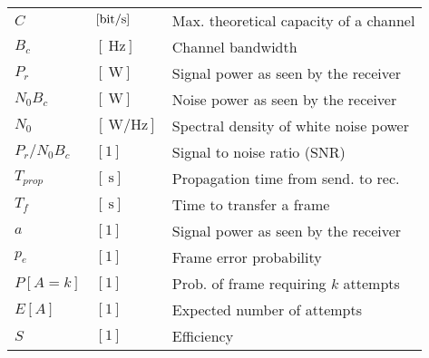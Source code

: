 \documentclass{form}
\begin{document}
\begin{center}
    \noindent%
    \begin{minipage}{0.49\textwidth}
        \begin{tabular}{@{}l l | p{59mm}@{}}
            $C$           & $[\SI{}{\bit/\second}     ]$ & Max. theoretical capacity of a channel                      \\
            $B_c$         & $[\SI{}{\hertz}           ]$ & Channel bandwidth                                           \\
            $P_r$         & $[\SI{}{\watt}            ]$ & Signal power as seen by the receiver                        \\
            $N_0 B_c$     & $[\SI{}{\watt}            ]$ & Noise power as seen by the receiver                         \\
            $N_0$         & $[\SI{}{\watt/\hertz}     ]$ & Spectral density of white noise power                       \\
            $P_r/N_0 B_c$ & $[1                       ]$ & Signal to noise ratio (SNR)                                 \\
            $T_{prop}$    & $[\SI{}{\second}          ]$ & Propagation time from send. to rec.                         \\
            $T_f$         & $[\SI{}{\second}          ]$ & Time to transfer a frame                                    \\
            $a$           & $[1                       ]$ & Signal power as seen by the receiver                        \\
            $p_e$         & $[1                       ]$ & Frame error probability                                     \\
            $P[A=k]$      & $[1                       ]$ & Prob. of frame requiring $k$ attempts                       \\
            $E[A]$        & $[1                       ]$ & Expected number of attempts                                 \\
            $S$           & $[1                       ]$ & Efficiency                                                  \\
        \end{tabular}
    \end{minipage}
    \begin{minipage}{0.49\textwidth}
        \begin{tabular}{l l | p{59mm}}

\end{tabular}
\end{minipage}
\end{center}
\end{document}
